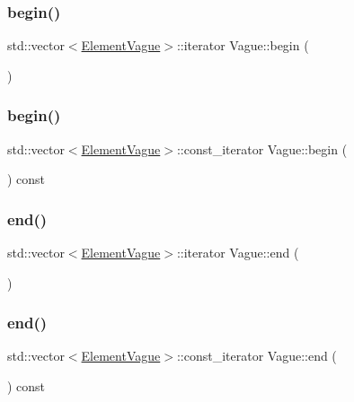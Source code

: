 \subsubsection{\texorpdfstring{begin()}{begin()}\hspace{0.1cm}{\footnotesize\ttfamily [1/2]}}
{\footnotesize\ttfamily std\+::vector$<$\mbox{\hyperlink{struct_element_vague}{Element\+Vague}}$>$\+::iterator Vague\+::begin (\begin{DoxyParamCaption}{ }\end{DoxyParamCaption})\hspace{0.3cm}{\ttfamily [inline]}}

\mbox{\label{class_vague_a5470d1e3e46fb8a79d1875f81aef528a}} 
\subsubsection{\texorpdfstring{begin()}{begin()}\hspace{0.1cm}{\footnotesize\ttfamily [2/2]}}
{\footnotesize\ttfamily std\+::vector$<$\mbox{\hyperlink{struct_element_vague}{Element\+Vague}}$>$\+::const\+\_\+iterator Vague\+::begin (\begin{DoxyParamCaption}{ }\end{DoxyParamCaption}) const\hspace{0.3cm}{\ttfamily [inline]}}

\mbox{\label{class_vague_aef14ca0ef14911b98162038a81a06cf6}} 
\subsubsection{\texorpdfstring{end()}{end()}\hspace{0.1cm}{\footnotesize\ttfamily [1/2]}}
{\footnotesize\ttfamily std\+::vector$<$\mbox{\hyperlink{struct_element_vague}{Element\+Vague}}$>$\+::iterator Vague\+::end (\begin{DoxyParamCaption}{ }\end{DoxyParamCaption})\hspace{0.3cm}{\ttfamily [inline]}}

\mbox{\label{class_vague_ad62bcc2e340ebffe8efba1e4b7f03150}} 
\subsubsection{\texorpdfstring{end()}{end()}\hspace{0.1cm}{\footnotesize\ttfamily [2/2]}}
{\footnotesize\ttfamily std\+::vector$<$\mbox{\hyperlink{struct_element_vague}{Element\+Vague}}$>$\+::const\+\_\+iterator Vague\+::end (\begin{DoxyParamCaption}{ }\end{DoxyParamCaption}) const\hspace{0.3cm}{\ttfamily [inline]}}

